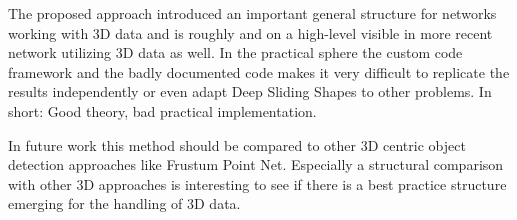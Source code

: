 \documentclass[12pt]{scrartcl}
\begin{document}
The proposed approach introduced an important general structure for networks
working with 3D data and is roughly and on a high-level visible in more recent
network utilizing 3D data as well. In the practical sphere the custom code
framework and the badly documented code makes it very difficult to replicate the
results independently or even adapt Deep Sliding Shapes to other problems.
In short: Good theory, bad practical implementation.

In future work this method should be compared to other 3D centric object detection
approaches like Frustum Point Net\cite{Qi2017}. Especially a structural comparison
with other 3D approaches is interesting to see if there is a best practice structure
emerging for the handling of 3D data.

\newpage
\printbibliography
{}%
\end{document}
